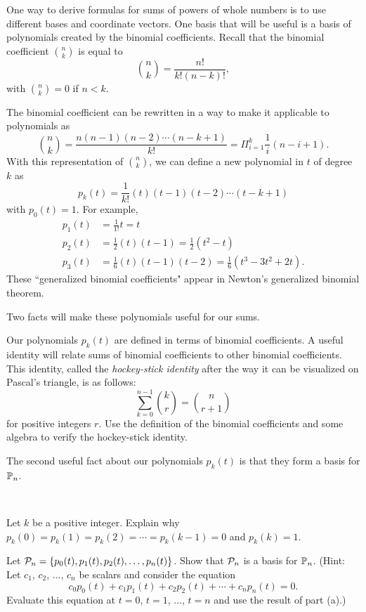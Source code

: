 One way to derive formulas for sums of powers of whole numbers is to use different bases and coordinate vectors. One basis that will be useful is a basis of polynomials created by the binomial coefficients. Recall that the binomial coefficient $\binom{n}{k}$ is equal to 
\[\binom{n}{k} = \frac{n!}{k!(n-k)!},\]
with $\binom{n}{k} = 0$ if $n < k$. 

The binomial coefficient can be rewritten in a way to make it applicable to polynomials as 
\[\binom{n}{k} = \frac{n(n-1)(n-2) \cdots (n-k+1)}{k!} = \Pi_{i=1}^k \frac{1}{i}(n-i+1).\]
With this representation of $\binom{n}{k}$, we can define a new polynomial in $t$ of degree $k$ as 
\[p_{k}(t) = \frac{1}{k!}(t)(t-1)(t-2) \cdots (t-k+1)\]
with $p_0(t) = 1$. 
For example,
\begin{align*}
p_1(t) &= \frac{1}{1!}t = t \\
p_2(t) &= \frac{1}{2}(t)(t-1) = \frac{1}{2}\left(t^2-t\right) \\
p_3(t) &= \frac{1}{6}(t)(t-1)(t-2) = \frac{1}{6}\left(t^3-3t^2+2t\right).
\end{align*}
These ``generalized binomial coefficients" appear in Newton's generalized binomial theorem. 

Two facts will make these polynomials useful for our sums. 

\begin{pactivity} \label{act:hockey_stick} Our polynomials $p_k(t)$ are defined in terms of binomial coefficients. A useful identity will relate sums of binomial coefficients to other binomial coefficients. This identity, called the \emph{hockey-stick identity} after the way it can be visualized on Pascal's triangle, is as follows:
\[\sum_{k=0}^{n-1} \binom{k}{r} = \binom{n}{r+1}\]
for positive integers $r$. Use the definition of the binomial coefficients and some algebra to verify the hockey-stick identity.


\end{pactivity}


The second useful fact about our polynomials $p_k(t)$ is that they form a basis for $\mathbb{P}_n$. 

\begin{pactivity} \label{act:binomial_basis} 	~
\ba
\item Let $k$ be a positive integer. Explain why $p_k(0) = p_k(1) = p_k(2) = \cdots = p_k(k-1) = 0$ and $p_k(k) = 1$.


\item Let $\mathcal{P}_n = \{p_0(t), p_1(t), p_2(t), \ldots, p_n(t)\}$. Show that $\mathcal{P}_n$ is a basis for $\mathbb{P}_n$. (Hint: Let $c_1$, $c_2$, $\ldots$, $c_n$ be scalars and consider the equation
\[c_0p_0(t) + c_1p_1(t) + c_2 p_2(t) + \cdots + c_np_n(t) = 0.\]
Evaluate this equation at $t=0$, $t=1$, $\ldots$, $t=n$ and use the result of part (a).) 



\ea

\end{pactivity} 

